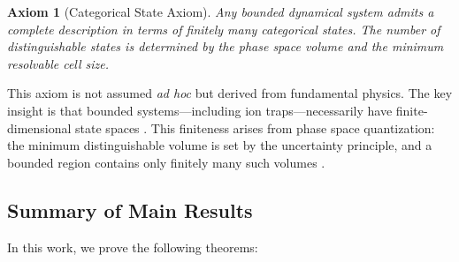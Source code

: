 \documentclass[twocolumn,10pt]{article}
\newtheorem{axiom}{Axiom}
\begin{document}
\begin{axiom}[Categorical State Axiom]
\label{axiom:categorical}
Any bounded dynamical system admits a complete description in terms of finitely many categorical states. The number of distinguishable states is determined by the phase space volume and the minimum resolvable cell size.
\end{axiom}

This axiom is not assumed \textit{ad hoc} but derived from fundamental physics. The key insight is that bounded systems---including ion traps---necessarily have finite-dimensional state spaces \citep{landau1980statistical}. This finiteness arises from phase space quantization: the minimum distinguishable volume is set by the uncertainty principle, and a bounded region contains only finitely many such volumes \citep{liouville1838note}.

\subsection{Summary of Main Results}

In this work, we prove the following theorems:
\end{document}
